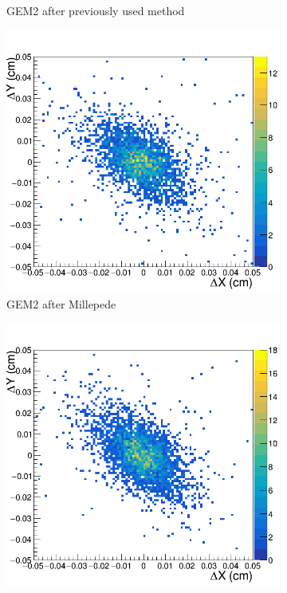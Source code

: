 \begin{figure}[h!]
\begin{subfigure}[l]{.45\textwidth}
   \caption{GEM2 after previously used method}
   \label{fig:GEM2_after_prev}
 \end{subfigure}
 \begin{subfigure}[r]{.45\textwidth}
   \centering
   \includegraphics[width=\linewidth]{thesis_figures/alignment/Run_3211_after_millepede/square/GEM2.png}
   \caption{GEM2 after Millepede}
 \end{subfigure}
 \begin{subfigure}[l]{.45\textwidth}
   \centering
   \includegraphics[width=\linewidth]{thesis_figures/alignment/Run_3211_after_prev/square/GEM4.png}


\end{subfigure}
\end{figure}
